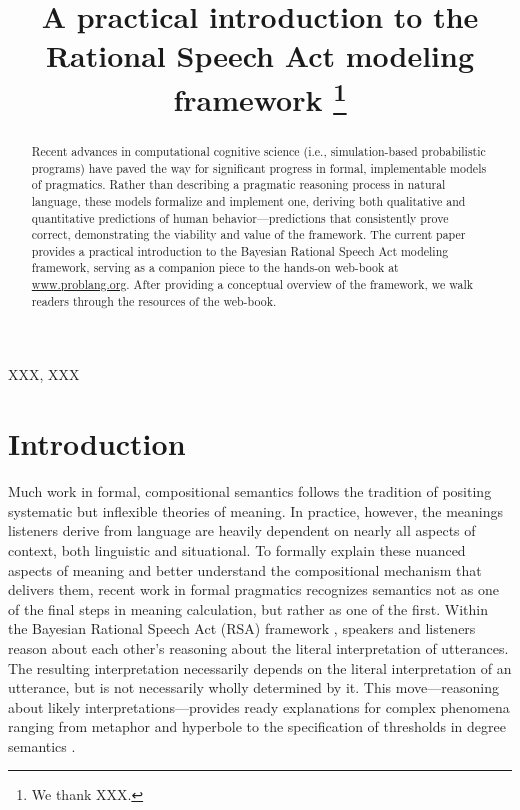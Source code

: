\documentclass{sp}
\title[Practical introduction to RSA]{A practical introduction to the Rational Speech Act modeling framework%
	\thanks{We thank XXX.}}
\author[]{%
}
\begin{document}
\maketitle

\begin{abstract}
	Recent advances in computational cognitive science (i.e., simulation-based probabilistic programs) have paved the way for significant progress in formal, implementable models of pragmatics. Rather than describing a pragmatic reasoning process in natural language, these models formalize and implement one, deriving both qualitative and quantitative predictions of human behavior---predictions that consistently prove correct, demonstrating the viability and value of the framework. The current paper provides a practical introduction to the Bayesian Rational Speech Act modeling framework, serving as a companion piece to the hands-on web-book at \href{https://www.problang.org}{www.problang.org}. After providing a conceptual overview of the framework, we walk readers through the resources of the web-book.
\end{abstract}

\begin{keywords}
	XXX, XXX
\end{keywords}

\tableofcontents

\section{Introduction}

Much work in formal, compositional semantics follows the tradition of positing systematic but inflexible theories of meaning. In practice, however, the meanings listeners derive from language are heavily dependent on nearly all aspects of context, both linguistic and situational. To formally explain these nuanced aspects of meaning and better understand the compositional mechanism that delivers them, recent work in formal pragmatics recognizes semantics not as one of the final steps in meaning calculation, but rather as one of the first. Within the Bayesian Rational Speech Act (RSA) framework \citep{goodmanfrank2016,frankejaeger2016}, speakers and listeners reason about each other's reasoning about the literal interpretation of utterances. The resulting interpretation necessarily depends on the literal interpretation of an utterance, but is not necessarily wholly determined by it. This move---reasoning about likely interpretations---provides ready explanations for complex phenomena ranging from metaphor \citep{kaoetal2014metaphor} and hyperbole \citep{kaoetal2014} to the specification of thresholds in degree semantics \citep{lassitergoodman2013}.
\end{document}

